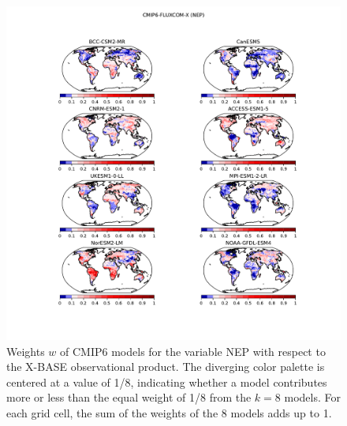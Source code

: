 \documentclass[gmd, manuscript]{copernicus}
\begin{document}
\clearpage 

\begin{figure}[htbp]
   \centering
   \includegraphics[width=14cm, trim={3.9cm, 2cm, 3.3cm, 2.5cm}, clip]{Figures/CMIP6_FLUXCOM_weights.pdf} %
   \caption{Weights $w$ of CMIP6 models for the variable NEP with respect to the X-BASE observational product. The diverging color palette is centered at a value of 1/8,  indicating whether a model contributes more or less than the equal weight of 1/8 from the $k= 8$ models. For each grid cell, the sum of the weights of the 8 models adds up to 1. }
   \label{fig:wFluxcom}
\end{figure}
\end{document}
